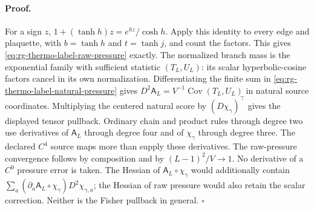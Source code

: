\paragraph{Proof.}
For a sign $z$,
$1+(\tanh h)z=e^{hz}/\cosh h$. Apply this identity to every edge and
plaquette, with $b=\tanh h$ and $t=\tanh j$, and count the factors.
This gives \cref{eq:rg-thermo-label-raw-pressure} exactly. The normalized
branch mass is the exponential family with sufficient statistic
$(T_L,U_L)$: its scalar hyperbolic-cosine factors cancel in its own
normalization. Differentiating the finite sum in
\cref{eq:rg-thermo-label-natural-pressure} gives
$D^2\mathsf A_L=V^{-1}\operatorname{Cov}(T_L,U_L)$ in natural source
coordinates. Multiplying the centered natural score by
$(D\chi_\gamma)^\top$ gives the displayed tensor pullback. Ordinary
chain and product rules through degree two use derivatives of
$\mathsf A_L$ through degree four and of $\chi_\gamma$ through degree
three. The declared $C^4$ source maps more than supply these derivatives.
The raw-pressure convergence follows by composition and by
$(L-1)^2/V\to1$. No derivative of a $C^0$ pressure error is taken.
The Hessian of $\mathsf A_L\circ\chi_\gamma$ would additionally contain
$\sum_a(\partial_a\mathsf A_L\circ\chi_\gamma)D^2\chi_{\gamma,a}$;
the Hessian of raw pressure would also retain the scalar correction.
Neither is the Fisher pullback in general. $\square$

